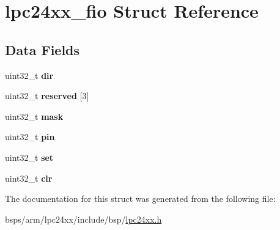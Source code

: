 \hypertarget{structlpc24xx__fio}{}\section{lpc24xx\+\_\+fio Struct Reference}
\label{structlpc24xx__fio}
\subsection*{Data Fields}
\begin{DoxyCompactItemize}
\item 
\mbox{\label{structlpc24xx__fio_a6d44ce8358dbc35db5461d5f193c9809}} 
uint32\+\_\+t {\bfseries dir}
\item 
\mbox{\label{structlpc24xx__fio_a7aeae09ecf8e130e65d2e6927d60fbd0}} 
uint32\+\_\+t {\bfseries reserved} \mbox{[}3\mbox{]}
\item 
\mbox{\label{structlpc24xx__fio_ac1b32cec60d2509007317b8101049b23}} 
uint32\+\_\+t {\bfseries mask}
\item 
\mbox{\label{structlpc24xx__fio_adf0e7db4497b4e13d96aebaca6ad11a9}} 
uint32\+\_\+t {\bfseries pin}
\item 
\mbox{\label{structlpc24xx__fio_a09533aaecc57913d97259464cab485c1}} 
uint32\+\_\+t {\bfseries set}
\item 
\mbox{\label{structlpc24xx__fio_a4edbfd3e804e8dae37ef2b71e0666476}} 
uint32\+\_\+t {\bfseries clr}
\end{DoxyCompactItemize}


The documentation for this struct was generated from the following file\+:\begin{DoxyCompactItemize}
\item 
bsps/arm/lpc24xx/include/bsp/\mbox{\hyperlink{lpc24xx_8h}{lpc24xx.\+h}}\end{DoxyCompactItemize}
